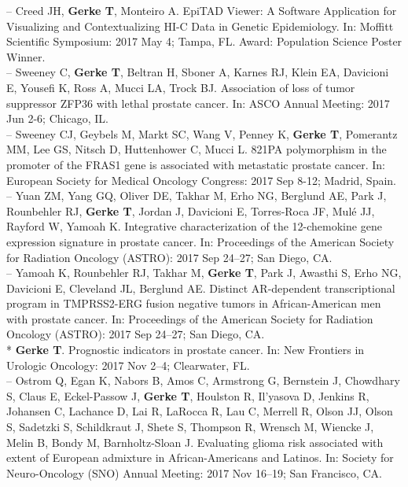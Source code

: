 \documentclass[11pt, a4paper]{article} %
\begin{document}
-- Creed JH, {\bf Gerke T}, Monteiro A. EpiTAD Viewer: A Software Application for Visualizing and Contextualizing HI-C Data in Genetic Epidemiology. In: Moffitt Scientific Symposium: 2017 May 4; Tampa, FL. Award: Population Science Poster Winner.\\

-- Sweeney C, {\bf Gerke T}, Beltran H, Sboner A, Karnes RJ, Klein EA, Davicioni E, Yousefi K, Ross A, Mucci LA, Trock BJ. Association of loss of tumor suppressor ZFP36 with lethal prostate cancer. In: ASCO Annual Meeting: 2017 Jun 2-6; Chicago, IL.\\

-- Sweeney CJ, Geybels M, Markt SC, Wang V, Penney K, {\bf Gerke T}, Pomerantz MM, Lee GS, Nitsch D, Huttenhower C, Mucci L. 821PA polymorphism in the promoter of the FRAS1 gene is associated with metastatic prostate cancer. In: European Society for Medical Oncology Congress: 2017 Sep 8-12; Madrid, Spain.\\

-- Yuan ZM, Yang GQ, Oliver DE, Takhar M, Erho NG, Berglund AE, Park J, Rounbehler RJ, {\bf Gerke T}, Jordan J, Davicioni E, Torres-Roca JF, Mul\'{e} JJ, Rayford W, Yamoah K. Integrative characterization of the 12-chemokine gene expression signature in prostate cancer. In: Proceedings of the American Society for Radiation Oncology (ASTRO): 2017 Sep 24--27; San Diego, CA.\\

-- Yamoah K, Rounbehler RJ, Takhar M, {\bf Gerke T}, Park J, Awasthi S, Erho NG, Davicioni E, Cleveland JL, Berglund AE. Distinct AR-dependent transcriptional program in TMPRSS2-ERG fusion negative tumors in African-American men with prostate cancer. In: Proceedings of the American Society for Radiation Oncology (ASTRO): 2017 Sep 24--27; San Diego, CA.\\

* {\bf Gerke T}. Prognostic indicators in prostate cancer. In: New Frontiers in Urologic Oncology: 2017 Nov 2--4; Clearwater, FL.\\

-- Ostrom Q, Egan K, Nabors B, Amos C, Armstrong G, Bernstein J, Chowdhary S, Claus E, Eckel-Passow J, {\bf Gerke T}, Houlston R, Il'yasova D, Jenkins R, Johansen C, Lachance D, Lai R, LaRocca R, Lau C, Merrell R, Olson JJ, Olson S, Sadetzki S, Schildkraut J, Shete S, Thompson R, Wrensch M, Wiencke J, Melin B, Bondy M, Barnholtz-Sloan J. Evaluating glioma risk associated with extent of European admixture in African-Americans and Latinos. In: Society for Neuro-Oncology (SNO) Annual Meeting: 2017 Nov 16--19; San Francisco, CA.\\
\end{document}
